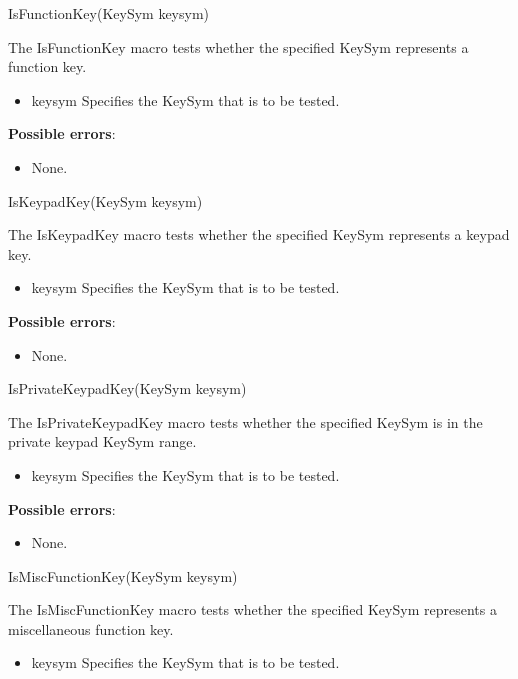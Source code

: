\documentclass{report}
\begin{document}
\begin{itemize}
        \begin{cppcode}
        IsFunctionKey(KeySym keysym)
        \end{cppcode}
        \bigbreak \noindent
        The IsFunctionKey macro tests whether the specified KeySym represents a function key.
        \begin{itemize}
            \item keysym Specifies the KeySym that is to be tested.
        \end{itemize}

        \textbf{Possible errors}:
        \begin{itemize}
            \item None.
        \end{itemize}

        \begin{cppcode}
        IsKeypadKey(KeySym keysym)
        \end{cppcode}
        \bigbreak \noindent
        The IsKeypadKey macro tests whether the specified KeySym represents a keypad key.
        \begin{itemize}
            \item keysym Specifies the KeySym that is to be tested.
        \end{itemize}

        \textbf{Possible errors}:
        \begin{itemize}
            \item None.
        \end{itemize}

        \begin{cppcode}
        IsPrivateKeypadKey(KeySym keysym)
        \end{cppcode}
        \bigbreak \noindent
        The IsPrivateKeypadKey macro tests whether the specified KeySym is in the private keypad KeySym range.
        \begin{itemize}
            \item keysym Specifies the KeySym that is to be tested.
        \end{itemize}

        \textbf{Possible errors}:
        \begin{itemize}
            \item None.
        \end{itemize}

        \begin{cppcode}
        IsMiscFunctionKey(KeySym keysym)
        \end{cppcode}
        \bigbreak \noindent
        The IsMiscFunctionKey macro tests whether the specified KeySym represents a miscellaneous function key.
        \begin{itemize}
            \item keysym Specifies the KeySym that is to be tested.
        \end{itemize}


\end{itemize}
\end{document}
